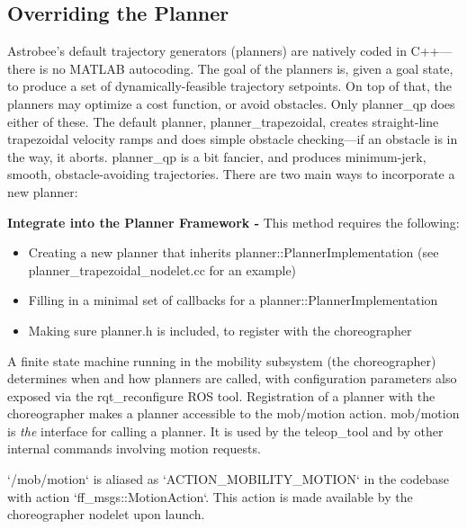 \documentclass{article}
\begin{document}
\subsection{Overriding the Planner}
\label{sec:plan}
Astrobee's default trajectory generators (planners) are natively coded in C++---there is no MATLAB autocoding. The goal of the planners is, given a goal state, to produce a set of dynamically-feasible trajectory setpoints. On top of that, the planners may optimize a cost function, or avoid obstacles. Only planner\_qp does either of these. The default planner, planner\_trapezoidal, creates straight-line trapezoidal velocity ramps and does simple obstacle checking---if an obstacle is in the way, it aborts. planner\_qp is a bit fancier, and produces minimum-jerk, smooth, obstacle-avoiding trajectories. There are two main ways to incorporate a new planner:

\noindent\textbf{Integrate into the Planner Framework - } This method requires the following:
\begin{itemize}
	\item Creating a new planner that inherits planner::PlannerImplementation (see planner\_trapezoidal\_nodelet.cc for an example)
	\item Filling in a minimal set of callbacks for a planner::PlannerImplementation
	\item Making sure planner.h is included, to register with the choreographer
\end{itemize}

A finite state machine running in the mobility subsystem (the choreographer) determines when and how planners are called, with configuration parameters also exposed via the rqt\_reconfigure ROS tool. Registration of a planner with the choreographer makes a planner accessible to the mob/motion action. mob/motion is \textit{the} interface for calling a planner. It is used by the teleop\_tool and by other internal commands involving motion requests.

\begin{markdown}
`/mob/motion` is aliased as `ACTION_MOBILITY_MOTION` in the codebase with action `ff_msgs::MotionAction`. This action is made available by the choreographer nodelet upon launch.
\end{markdown}
\end{document}
